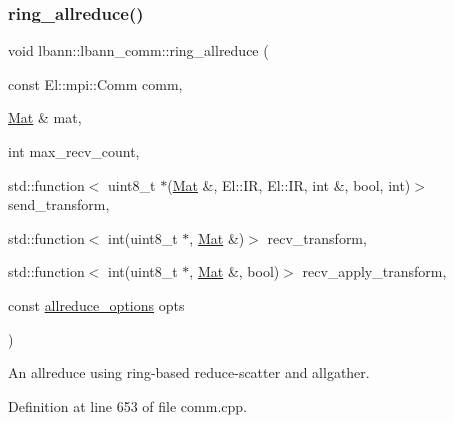 \subsubsection{\texorpdfstring{ring\+\_\+allreduce()}{ring\_allreduce()}}
{\footnotesize\ttfamily void lbann\+::lbann\+\_\+comm\+::ring\+\_\+allreduce (\begin{DoxyParamCaption}\item[{const El\+::mpi\+::\+Comm}]{comm,  }\item[{\hyperlink{base_8hpp_a68f11fdc31b62516cb310831bbe54d73}{Mat} \&}]{mat,  }\item[{int}]{max\+\_\+recv\+\_\+count,  }\item[{std\+::function$<$ uint8\+\_\+t $\ast$(\hyperlink{base_8hpp_a68f11fdc31b62516cb310831bbe54d73}{Mat} \&, El\+::\+IR, El\+::\+IR, int \&, bool, int)$>$}]{send\+\_\+transform,  }\item[{std\+::function$<$ int(uint8\+\_\+t $\ast$, \hyperlink{base_8hpp_a68f11fdc31b62516cb310831bbe54d73}{Mat} \&)$>$}]{recv\+\_\+transform,  }\item[{std\+::function$<$ int(uint8\+\_\+t $\ast$, \hyperlink{base_8hpp_a68f11fdc31b62516cb310831bbe54d73}{Mat} \&, bool)$>$}]{recv\+\_\+apply\+\_\+transform,  }\item[{const \hyperlink{structlbann_1_1lbann__comm_1_1allreduce__options}{allreduce\+\_\+options}}]{opts }\end{DoxyParamCaption})}

An allreduce using ring-\/based reduce-\/scatter and allgather. 

Definition at line 653 of file comm.\+cpp.


